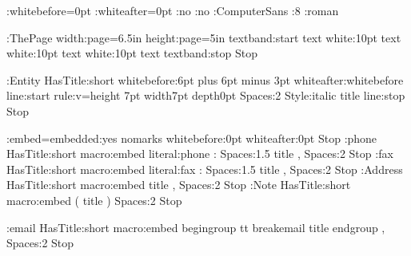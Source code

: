 %
%
%
%
%
%
%
%

%
\Distance:whitebefore=0pt \Distance:whiteafter=0pt
\AlwaysIndent:no \FlushRight:no
\TypeFace:ComputerSans \PointSize:8 \Style:roman
\def\\{,\Spaces:1 }

%
\DefinePageGrid:ThePage width:page=6.5in height:page=5in
 textband:start text white:10pt text white:10pt
   text white:10pt text textband:stop Stop

%
\DefineTextBlock:Entity HasTitle:short	
 whitebefore:{6pt plus 6pt minus 3pt} whiteafter:whitebefore
 line:start rule:v={height 7pt width7pt depth0pt} Spaces:2
      Style:italic title line:stop Stop

%
\OptionsMacro:embed=embedded:yes nomarks
 whitebefore:0pt whiteafter:0pt Stop
\DefineHeading:phone HasTitle:short macro:embed 
 literal:phone : Spaces:1.5 title , Spaces:2 Stop
\DefineHeading:fax HasTitle:short macro:embed
 literal:fax : Spaces:1.5 title , Spaces:2 Stop
\DefineHeading:Address HasTitle:short macro:embed
 title , Spaces:2 Stop
\DefineHeading:Note HasTitle:short macro:embed 
 ( title ) Spaces:2 Stop

%
\def\breakemail{\hyphenchar\font=`. }
\DefineHeading:email HasTitle:short macro:embed
 begingroup tt breakemail title endgroup , Spaces:2 Stop

